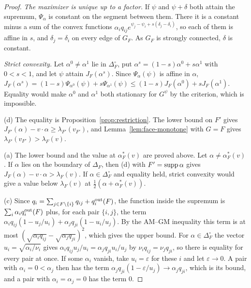 \begin{proof}
\emph{The maximizer is unique up to a factor.} If $\psi$ and $\psi+\delta$ both
attain the supremum, $\Psi_\alpha$ is constant on the segment between them. There
it is a constant minus a sum of the convex functions
$\alpha_iq_{ij}e^{\psi_j-\psi_i+s(\delta_j-\delta_i)}$, so each of them is affine
in $s$, and $\delta_j=\delta_i$ on every edge of $G_F$. As $G_F$ is strongly
connected, $\delta$ is constant.

\emph{Strict convexity.} Let $\alpha^0\ne\alpha^1$ lie in $\Delta_F^\circ$, put
$\alpha^s=(1-s)\alpha^0+s\alpha^1$ with $0<s<1$, and let $\psi$ attain
$J_F(\alpha^s)$. Since $\Psi_\alpha(\psi)$ is affine in $\alpha$,
$J_F(\alpha^s)=(1-s)\Psi_{\alpha^0}(\psi)+s\Psi_{\alpha^1}(\psi)\le(1-s)J_F(\alpha^0)+sJ_F(\alpha^1)$.
Equality would make $\alpha^0$ and $\alpha^1$ both stationary for $G^\psi$ by the
criterion, which is impossible.

(d) The equality is Proposition~\ref{prop:restriction}. The lower bound on $F'$
gives $J_{F'}(\alpha)-v\cdot\alpha\ge\lambda_{F'}(v_{F'})$, and
Lemma~\ref{lem:face-monotone} with $G=F$ gives $\lambda_{F'}(v_{F'})>\lambda_F(v)$.

(a) The lower bound and the value at $\alpha^*_F(v)$ are proved above. Let
$\alpha\ne\alpha^*_F(v)$. If $\alpha$ lies on the boundary of $\Delta_F$, then (d)
with $F'=\operatorname{supp}\alpha$ gives $J_F(\alpha)-v\cdot\alpha>\lambda_F(v)$. If
$\alpha\in\Delta_F^\circ$ and equality held, strict convexity would give a value
below $\lambda_F(v)$ at $\frac12(\alpha+\alpha^*_F(v))$.

(c) Since $q_i=\sum_{j\in F\setminus\{i\}}q_{ij}+q_i^{\rm out}(F)$, the function
inside the supremum is $\sum_i\alpha_iq_i^{\rm out}(F)$ plus, for each pair
$\{i,j\}$, the term $\alpha_iq_{ij}(1-u_j/u_i)+\alpha_jq_{ji}(1-u_i/u_j)$. By the
AM--GM inequality this term is at most
$(\sqrt{\alpha_iq_{ij}}-\sqrt{\alpha_jq_{ji}})^2$, which gives the upper bound. For
$\alpha\in\Delta_F^\circ$ the vector $u_i=\sqrt{\alpha_i/\nu_i}$ gives
$\alpha_iq_{ij}u_j/u_i=\alpha_jq_{ji}u_i/u_j$ by $\nu_iq_{ij}=\nu_jq_{ji}$, so there is
equality for every pair at once. If some $\alpha_i$ vanish, take $u_i=\varepsilon$
for these $i$ and let $\varepsilon\to0$. A pair with $\alpha_i=0<\alpha_j$ then has
the term $\alpha_jq_{ji}(1-\varepsilon/u_j)\to\alpha_jq_{ji}$, which is its bound, and
a pair with $\alpha_i=\alpha_j=0$ has the term $0$.
\end{proof}

